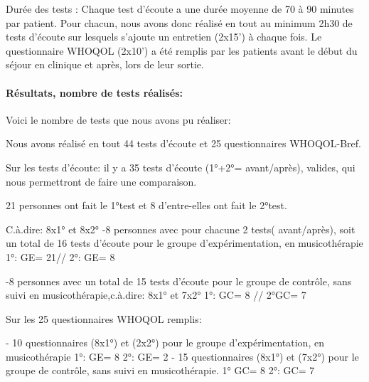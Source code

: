 	
	
	Durée des tests : Chaque test d'écoute a une durée  moyenne de
        70 à 90 minutes par patient. Pour chacun, nous avons donc réalisé
        en tout au minimum 2h30 de tests d'écoute sur lesquels
        s'ajoute un
        entretien (2x15') à chaque fois.
        Le questionnaire WHOQOL (2x10')  a été remplis par les
        patients avant le début du séjour en clinique et après, lors
        de leur sortie.
        
       
      
      \paragraph{Résultats, nombre de tests réalisés:}


        
        Voici le nombre de tests que nous avons pu réaliser:
        
     Nous avons réalisé en tout 44 tests d'écoute et 25 questionnaires 
     WHOQOL-Bref.
     
     Sur les tests d'écoute: il y a 35 tests d'écoute (1°+2°=
     avant/après), valides, qui nous permettront de faire une
     comparaison.

     
     21 personnes ont fait le 1°test et 8 d'entre-elles ont fait le
     2°test.

     C.à.dire: 8x1° et 8x2°
     -8 personnes avec pour chacune 2 tests( avant/après), soit  un
     total de 16 tests d'écoute pour le groupe d'expérimentation, en musicothérapie
     1°: GE= 21// 2°: GE= 8
     
     -8 personnes avec un total de 15 tests d'écoute pour le groupe de contrôle, sans suivi en 
     musicothérapie,c.à.dire: 8x1° et 7x2°
     1°: GC= 8 // 2°GC= 7

     
           Sur les 25  questionnaires WHOQOL remplis:
           
     - 10 questionnaires (8x1°) et (2x2°) pour le groupe d'expérimentation, en musicothérapie
     1°: GE= 8                        2°: GE= 2
     - 15 questionnaires (8x1°) et (7x2°) pour le groupe de contrôle, sans suivi en 
     musicothérapie.
     1° GC= 8                           2°: GC= 7
     
     
    
 
     
          
 
 
 	
 	
       

